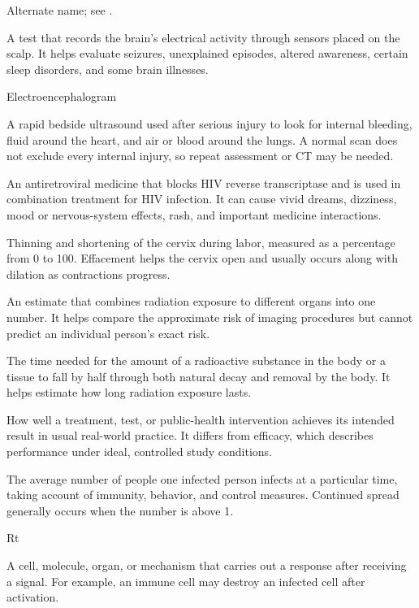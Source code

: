  Alternate name; see
  .

 A test that records the brain’s electrical activity through sensors placed on the scalp. It helps evaluate seizures, unexplained episodes, altered awareness, certain sleep disorders, and some brain illnesses.

\synonyms
Electroencephalogram

 A rapid bedside ultrasound used after serious injury to look for internal bleeding, fluid around the heart, and air or blood around the lungs. A normal scan does not exclude every internal injury, so repeat assessment or CT may be needed.

 An antiretroviral medicine that blocks HIV reverse transcriptase and is used in combination treatment for HIV infection. It can cause vivid dreams, dizziness, mood or nervous-system effects, rash, and important medicine interactions.

 Thinning and shortening of the cervix during labor, measured as a percentage from 0 to 100. Effacement helps the cervix open and usually occurs along with dilation as contractions progress.

 An estimate that combines radiation exposure to different organs into one number. It helps compare the approximate risk of imaging procedures but cannot predict an individual person’s exact risk.

 The time needed for the amount of a radioactive substance in the body or a tissue to fall by half through both natural decay and removal by the body. It helps estimate how long radiation exposure lasts.

 How well a treatment, test, or public-health intervention achieves its intended result in usual real-world practice. It differs from efficacy, which describes performance under ideal, controlled study conditions.

 The average number of people one infected person infects at a particular time, taking account of immunity, behavior, and control measures. Continued spread generally occurs when the number is above 1.

\synonyms
Rt

 A cell, molecule, organ, or mechanism that carries out a response after receiving a signal. For example, an immune cell may destroy an infected cell after activation.

